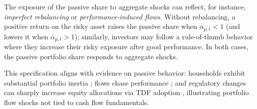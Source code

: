 The exposure of the passive share to aggregate shocks can reflect, for instance, \emph{imperfect rebalancing} or \emph{performance-induced flows}. Without rebalancing, a positive return on the risky asset raises the passive share when $\overline{\alpha}_{p,t}<1$ (and lowers it when $\overline{\alpha}_{p,t}>1$); similarly, investors may follow a rule-of-thumb behavior where they increase their risky exposure after good performance. In both cases, the passive portfolio share responds to aggregate shocks.

This specification aligns with evidence on passive behavior: households exhibit substantial portfolio inertia \citep{ameriks2011household,brunnermeier2008wealth}; flows chase performance \citep{chevalier1997risk,dannhauser2024flow}; and regulatory changes can sharply increase equity allocations via TDF adoption \citep{parker2022household}, illustrating portfolio flow shocks not tied to cash flow fundamentals.




